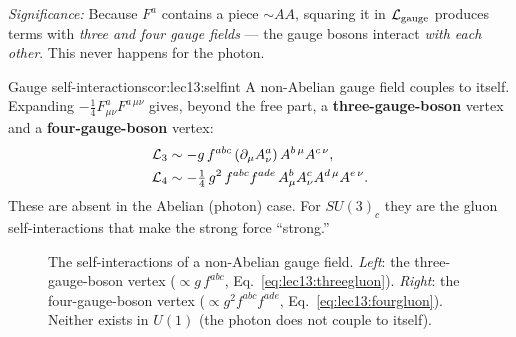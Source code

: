 \documentclass[../main.tex]{subfiles}
\begin{document}
\textit{Significance:} Because $F^a$ contains a piece $\sim A A$, squaring it in $\mathcal{L}_{\rm gauge}$ produces terms with \emph{three and four gauge fields} --- the gauge bosons interact \emph{with each other}. This never happens for the photon.

\begin{Corollary}{Gauge self-interactions}{cor:lec13:selfint}
A non-Abelian gauge field couples to itself. Expanding $-\tfrac14 F^a_{\mu\nu}F^{a\,\mu\nu}$ gives, beyond the free part, a \textbf{three-gauge-boson} vertex and a \textbf{four-gauge-boson} vertex:
\begin{align}
  \mathcal{L}_3 &\sim -g\,f^{abc}\,(\partial_\mu A_\nu^a)\,A^{b\,\mu}A^{c\,\nu},
  \label{eq:lec13:threegluon}\\
  \mathcal{L}_4 &\sim -\tfrac14\,g^2\,f^{abc}f^{ade}\,A_\mu^b A_\nu^c A^{d\,\mu}A^{e\,\nu}.
  \label{eq:lec13:fourgluon}
\end{align}
These are absent in the Abelian (photon) case. For $SU(3)_c$ they are the gluon self-interactions that make the strong force ``strong.''
\end{Corollary}

\begin{figure}[ht]
\centering
{}
\hspace{2.2cm}
\caption{The self-interactions of a non-Abelian gauge field. \emph{Left}: the three-gauge-boson vertex ($\propto g\,f^{abc}$, Eq.~\eqref{eq:lec13:threegluon}). \emph{Right}: the four-gauge-boson vertex ($\propto g^2 f^{abc}f^{ade}$, Eq.~\eqref{eq:lec13:fourgluon}). Neither exists in $U(1)$ (the photon does not couple to itself).}
\label{fig:lec13:selfint}
\end{figure}
\end{document}
